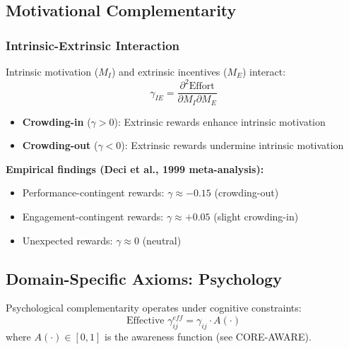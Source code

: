 \subsection{Motivational Complementarity}

\subsubsection{Intrinsic-Extrinsic Interaction}

\begin{theorem}
Intrinsic motivation ($M_I$) and extrinsic incentives ($M_E$) interact:
\begin{equation}
\gamma_{IE} = \frac{\partial^2 \text{Effort}}{\partial M_I \partial M_E}
\end{equation}
\begin{itemize}
    \item \textbf{Crowding-in} ($\gamma > 0$): Extrinsic rewards enhance intrinsic motivation
    \item \textbf{Crowding-out} ($\gamma < 0$): Extrinsic rewards undermine intrinsic motivation
\end{itemize}
\end{theorem}

\textbf{Empirical findings (Deci et al., 1999 meta-analysis):}
\begin{itemize}[noitemsep]
    \item Performance-contingent rewards: $\gamma \approx -0.15$ (crowding-out)
    \item Engagement-contingent rewards: $\gamma \approx +0.05$ (slight crowding-in)
    \item Unexpected rewards: $\gamma \approx 0$ (neutral)
\end{itemize}

\subsection{Domain-Specific Axioms: Psychology}

\begin{axiom}
Psychological complementarity operates under cognitive constraints:
\begin{equation}
\text{Effective } \gamma^{eff}_{ij} = \gamma_{ij} \cdot A(\cdot)
\end{equation}
where $A(\cdot) \in [0,1]$ is the awareness function (see CORE-AWARE).
\end{axiom}

